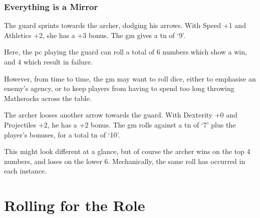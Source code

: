 \begin{multicols}{2}
\subsubsection{Everything is a Mirror}

\begin{exampletext}
  The guard sprints towards the archer, dodging his arrows.
  With Speed +1 and Athletics +2, she has a +3 bonus.
  The \gls{gm} gives a \gls{tn} of `9'.
\end{exampletext}

\noindent
Here, the \gls{pc} playing the guard can roll a total of 6 numbers which show a win, and 4 which result in failure.

However, from time to time, the \gls{gm} may want to roll dice, either to emphasise an enemy's agency, or to keep players from having to spend too long throwing Mathsrocks across the table.

\begin{exampletext}
  The archer looses another arrow towards the guard.
  With Dexterity +0 and Projectiles +2, he has a +2 bonus.
  The \gls{gm} rolls against a \gls{tn} of `7' plus the player's bonuses, for a total \gls{tn} of `10'.
\end{exampletext}

\noindent
This might look different at a glance, but of course the archer wins on the top 4 numbers, and loses on the lower 6.
Mechanically, the same roll has occurred in each instance.

\end{multicols}

\section{Rolling for the Role}
\label{rollForRoles}

